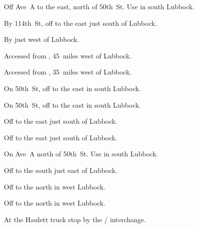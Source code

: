 

\begin{LocationList}

Off Ave~A to the east, north of 50th~St.
Use    in south Lubbock.

By 114th~St, off  to the east just south of Lubbock.

By  just west of Lubbock.

Accessed from , 45~miles west of Lubbock.

Accessed from , 35~miles west of Lubbock.

On 50th~St, off    to the east in south Lubbock.

On 50th~St, off    to the east in south Lubbock.

Off  to the east just south of Lubbock.

Off  to the east just south of Lubbock.

On Ave~A north of 50th~St.
Use    in south Lubbock.

Off  to the south just east of Lubbock.

Off  to the north in west Lubbock.

Off  to the north in west Lubbock.

At the Haulett truck stop by the   /   interchange.

\end{LocationList}
